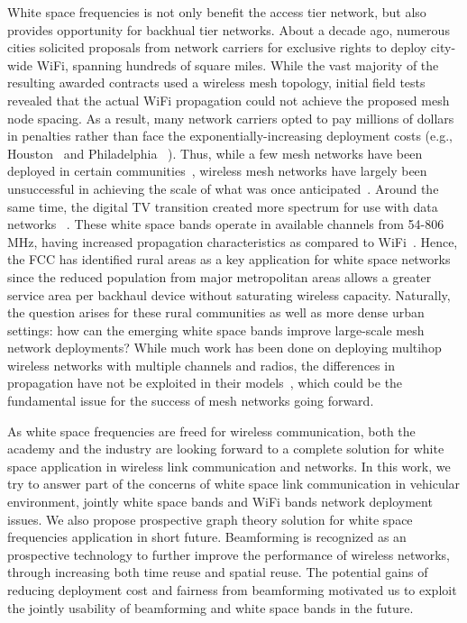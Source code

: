 White space frequencies is not only benefit the access tier network, 
but also provides opportunity for backhual tier networks. About a 
decade ago, numerous cities solicited proposals from network carriers 
for exclusive rights to deploy city-wide WiFi, spanning hundreds of 
square miles. While the vast majority of the resulting awarded 
contracts used a wireless mesh topology, initial field tests revealed 
that the actual WiFi propagation could not achieve the proposed mesh node
spacing. As a result, many network carriers opted to pay millions of 
dollars in penalties rather than face the exponentially-increasing
deployment costs (e.g., Houston~\cite{cnet_aug07} and Philadelphia
~\cite{arstechnica_may08}). Thus, while a few mesh networks have been 
deployed in certain communities~\cite{CRSK06,google_imc08}, wireless 
mesh networks have largely been unsuccessful in achieving the scale 
of what was once anticipated~\cite{taps}. Around the same time, the 
digital TV transition created more spectrum for use with data networks
~\cite{fccwhitespace}. These white space bands operate in available 
channels from 54-806 MHz, having increased propagation characteristics 
as compared to WiFi~\cite{balanis2012antenna}. Hence, the FCC has 
identified rural areas as a key application for white space networks 
since the reduced population from major metropolitan areas allows a 
greater service area per backhaul device without saturating wireless 
capacity. Naturally, the question arises for these rural communities 
as well as more dense urban settings: how can the emerging white space 
bands improve large-scale mesh network deployments?  While much work 
has been done on deploying multihop wireless networks with multiple 
channels and radios, the differences in propagation have not be 
exploited in their models~\cite{raniwala2004centralized,tang2005interference, si2010overview}, 
which could be the fundamental issue for the success of mesh networks 
going forward.

As white space frequencies are freed for wireless communication,
both the academy and the industry are looking forward to a complete
solution for white space application in wireless link communication
and networks. In this work, we try to answer part of the concerns
of white space link communication in vehicular environment, jointly 
white space bands and WiFi bands network deployment issues. We also
propose prospective graph theory solution for white space frequencies
application in short future. Beamforming is recognized as an prospective 
technology to further improve the performance of wireless networks, 
through increasing both time reuse and spatial reuse. The potential 
gains of reducing deployment cost and fairness from beamforming 
motivated us to exploit the jointly usability of beamforming and 
white space bands in the future.


